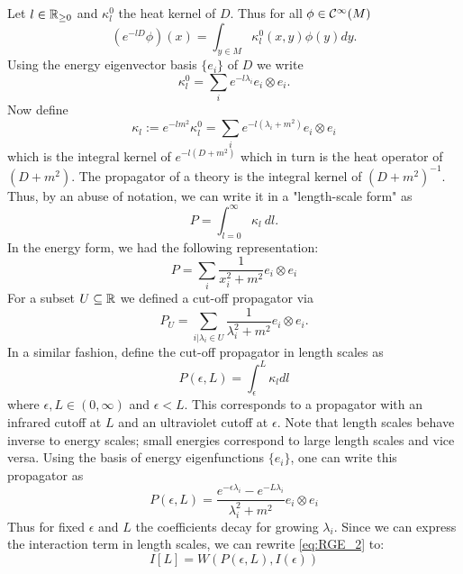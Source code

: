 Let $l \in \mathbb{R}_{\geq 0}$ and $\kappa^0_l$ the heat kernel of $D$. Thus for all $\phi \in \Ci(M)$
\begin{equation}
  \left( e^{-l D}\phi \right) (x) = \int_{y \in M} \kappa^0_l (x,y) \phi(y) dy.
\end{equation}
Using the energy eigenvector basis $\{e_i\}$ of $D$ we write
\begin{equation}
  \kappa^0_l = \sum_i e^{-l \lambda_i} e_i \otimes e_i.
\end{equation}
Now define
\begin{equation}
  \kappa_l := e^{-l m^2} \kappa^0_l = \sum_i e^{-l (\lambda_i + m^2)} e_i \otimes e_i
\end{equation}
which is the integral kernel of $e^{-l (D+m^2)}$ which in turn is the heat operator of $(D+m^2)$. The propagator of a theory is the integral kernel of $(D+m^2)^{-1}$. Thus, by an abuse of notation, we can write it in a "length-scale form" as
\begin{equation}
  P = \int_{l=0}^\infty \kappa_l \ dl.
\end{equation}
In the energy form, we had the following representation:
\begin{equation}
  P = \sum_i \frac{1}{x_i^2 + m^2} e_i \otimes e_i
\end{equation}
For a subset $U \subseteq \mathbb{R}$ we defined a cut-off propagator via
\begin{equation}
  P_U = \sum_{i|\lambda_i \in U} \frac{1}{\lambda_i^2 + m^2} e_i \otimes e_i.
\end{equation}
In a similar fashion, define the cut-off propagator in length scales as
\begin{equation}
  P(\epsilon, L) = \int_\epsilon^L \kappa_l dl
\end{equation}
where $\epsilon, L \in (0,\infty)$ and $\epsilon < L$. This corresponds to a propagator with an infrared cutoff at $L$ and an ultraviolet cutoff at $\epsilon$. Note that length scales behave inverse to energy scales; small energies correspond to large length scales and vice versa. Using the basis of energy eigenfunctions $\{e_i\}$, one can write this propagator as
\begin{equation}
  P(\epsilon, L) = \frac{e^{-\epsilon \lambda_i} - e^{-L  \lambda_i}}{\lambda_i^2 + m^2} e_i \otimes e_i
\end{equation}
Thus for fixed $\epsilon$ and $L$ the coefficients decay for growing $\lambda_i$. Since we can express the interaction term in length scales, we can rewrite \eqref{eq:RGE_2} to:
\begin{equation}
\label{eq:RGE_length}\tag{L-RGE}
  I[L] = W(P(\epsilon, L), I(\epsilon))
\end{equation}

